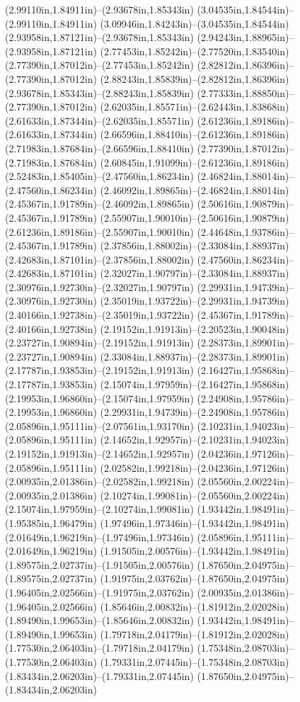 (2.99110in,1.84911in)--(2.93678in,1.85343in) (3.04535in,1.84544in)--(2.99110in,1.84911in) (3.09946in,1.84243in)--(3.04535in,1.84544in) (2.93958in,1.87121in)--(2.93678in,1.85343in) (2.94243in,1.88965in)--(2.93958in,1.87121in) (2.77453in,1.85242in)--(2.77520in,1.83540in) (2.77390in,1.87012in)--(2.77453in,1.85242in) (2.82812in,1.86396in)--(2.77390in,1.87012in) (2.88243in,1.85839in)--(2.82812in,1.86396in) (2.93678in,1.85343in)--(2.88243in,1.85839in) (2.77333in,1.88850in)--(2.77390in,1.87012in) (2.62035in,1.85571in)--(2.62443in,1.83868in) (2.61633in,1.87344in)--(2.62035in,1.85571in) (2.61236in,1.89186in)--(2.61633in,1.87344in) (2.66596in,1.88410in)--(2.61236in,1.89186in) (2.71983in,1.87684in)--(2.66596in,1.88410in) (2.77390in,1.87012in)--(2.71983in,1.87684in) (2.60845in,1.91099in)--(2.61236in,1.89186in) (2.52483in,1.85405in)--(2.47560in,1.86234in) (2.46824in,1.88014in)--(2.47560in,1.86234in) (2.46092in,1.89865in)--(2.46824in,1.88014in) (2.45367in,1.91789in)--(2.46092in,1.89865in) (2.50616in,1.90879in)--(2.45367in,1.91789in) (2.55907in,1.90010in)--(2.50616in,1.90879in) (2.61236in,1.89186in)--(2.55907in,1.90010in) (2.44648in,1.93786in)--(2.45367in,1.91789in) (2.37856in,1.88002in)--(2.33084in,1.88937in) (2.42683in,1.87101in)--(2.37856in,1.88002in) (2.47560in,1.86234in)--(2.42683in,1.87101in) (2.32027in,1.90797in)--(2.33084in,1.88937in) (2.30976in,1.92730in)--(2.32027in,1.90797in) (2.29931in,1.94739in)--(2.30976in,1.92730in) (2.35019in,1.93722in)--(2.29931in,1.94739in) (2.40166in,1.92738in)--(2.35019in,1.93722in) (2.45367in,1.91789in)--(2.40166in,1.92738in) (2.19152in,1.91913in)--(2.20523in,1.90048in) (2.23727in,1.90894in)--(2.19152in,1.91913in) (2.28373in,1.89901in)--(2.23727in,1.90894in) (2.33084in,1.88937in)--(2.28373in,1.89901in) (2.17787in,1.93853in)--(2.19152in,1.91913in) (2.16427in,1.95868in)--(2.17787in,1.93853in) (2.15074in,1.97959in)--(2.16427in,1.95868in) (2.19953in,1.96860in)--(2.15074in,1.97959in) (2.24908in,1.95786in)--(2.19953in,1.96860in) (2.29931in,1.94739in)--(2.24908in,1.95786in) (2.05896in,1.95111in)--(2.07561in,1.93170in) (2.10231in,1.94023in)--(2.05896in,1.95111in) (2.14652in,1.92957in)--(2.10231in,1.94023in) (2.19152in,1.91913in)--(2.14652in,1.92957in) (2.04236in,1.97126in)--(2.05896in,1.95111in) (2.02582in,1.99218in)--(2.04236in,1.97126in) (2.00935in,2.01386in)--(2.02582in,1.99218in) (2.05560in,2.00224in)--(2.00935in,2.01386in) (2.10274in,1.99081in)--(2.05560in,2.00224in) (2.15074in,1.97959in)--(2.10274in,1.99081in) (1.93442in,1.98491in)--(1.95385in,1.96479in) (1.97496in,1.97346in)--(1.93442in,1.98491in) (2.01649in,1.96219in)--(1.97496in,1.97346in) (2.05896in,1.95111in)--(2.01649in,1.96219in) (1.91505in,2.00576in)--(1.93442in,1.98491in) (1.89575in,2.02737in)--(1.91505in,2.00576in) (1.87650in,2.04975in)--(1.89575in,2.02737in) (1.91975in,2.03762in)--(1.87650in,2.04975in) (1.96405in,2.02566in)--(1.91975in,2.03762in) (2.00935in,2.01386in)--(1.96405in,2.02566in) (1.85646in,2.00832in)--(1.81912in,2.02028in) (1.89490in,1.99653in)--(1.85646in,2.00832in) (1.93442in,1.98491in)--(1.89490in,1.99653in) (1.79718in,2.04179in)--(1.81912in,2.02028in) (1.77530in,2.06403in)--(1.79718in,2.04179in) (1.75348in,2.08703in)--(1.77530in,2.06403in) (1.79331in,2.07445in)--(1.75348in,2.08703in) (1.83434in,2.06203in)--(1.79331in,2.07445in) (1.87650in,2.04975in)--(1.83434in,2.06203in) 